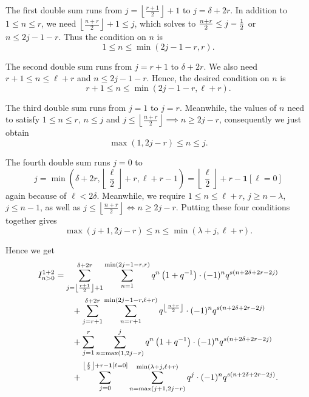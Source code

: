 \begin{itemize}
  \ii The first double sum runs from $j=\left\lfloor \frac{r+1}{2} \right\rfloor+1$ to $j=\delta+2r$.
  In addition to $1 \le n \le r$,
  we need $\left\lfloor \frac{n+r}{2} \right\rfloor + 1 \leq j$,
  which solves to $\frac{n+r}{2} \leq j-\frac{1}{2}$ or $n \leq 2j-1-r$.
  Thus the condition on $n$ is
  \[ 1 \leq n \leq \min(2j-1-r, r). \]

  \ii The second double sum runs from $j=r+1$ to $\delta+2r$.
  We also need $r+1 \le n \le \ell+r$ and $n \le 2j-1-r$.
  Hence, the desired condition on $n$ is
  \[ r+1 \leq n \leq \min(2j-1-r, \ell+r). \]

  \ii The third double sum runs from $j=1$ to $j=r$.
  Meanwhile, the values of $n$ need to satisfy $1 \le n \le r$, $n \leq j$
  and $j \leq \left\lfloor \frac{n+r}{2} \right\rfloor \implies n \geq 2j-r$,
  consequently we just obtain
  \[ \max(1, 2j-r) \leq n \leq j. \]

  \ii The fourth double sum runs $j=0$ to
  \[ j=\min\left( \delta+2r, \left\lfloor \frac{\ell}{2} \right\rfloor + r, \ell+r-1 \right)
    = \left\lfloor \frac{\ell}{2} \right\rfloor + r - \mathbf{1}[\ell = 0] \]
  again because of $\ell < 2\delta$.
  Meanwhile, we require $1 \le n \le \ell+r$, $j \ge n-\lambda$, $j \le n-1$,
  as well as $j \le \left\lfloor \frac{n+r}{2} \right\rfloor
  \iff n \ge 2j-r$.
  Putting these four conditions together gives
  \[ \max(j+1, 2j-r) \le n \le \min(\lambda+j, \ell+r). \]
\end{itemize}
Hence we get
\begin{align*}
  I_{n > 0}^{\text{1+2}}
  &= \sum_{j = \left\lfloor \frac{r+1}{2} \right\rfloor+ 1}^{\delta+2r}
    \sum_{n=1}^{\min(2j-1-r, r)}
    q^{n} \left( 1 + q^{-1} \right) \cdot (-1)^n q^{s(n+2\delta+2r-2j)} \\
  &\qquad+ \sum_{j = r+1}^{\delta + 2r}
    \sum_{n=r+1}^{\min(2j-1-r, \ell+r)}
    q^{\left\lfloor \frac{n+r}{2} \right\rfloor} \cdot (-1)^n q^{s(n+2\delta+2r-2j)} \\
  &\qquad+ \sum_{j=1}^{r}
    \sum_{n=\max(1,2j-r)}^{j}
    q^{n} \left( 1 + q^{-1} \right) \cdot (-1)^n q^{s(n+2\delta+2r-2j)} \\
  &\qquad+ \sum_{j=0}^{\left\lfloor \frac{\ell}{2} \right\rfloor + r - \mathbf{1}[\ell = 0]}
    \sum_{n=\max(j+1, 2j-r)}^{\min(\lambda+j, \ell+r)}
    q^{j} \cdot (-1)^n q^{s(n+2\delta+2r-2j)}.
\end{align*}

